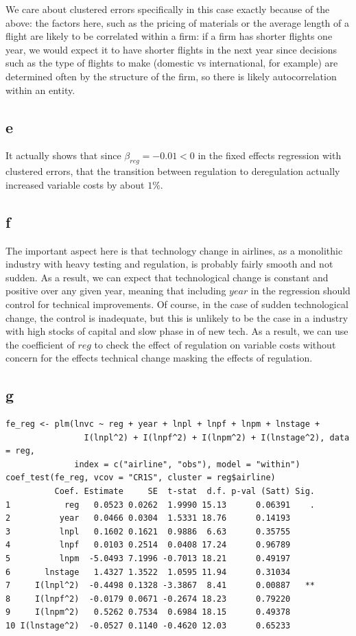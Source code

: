 \documentclass[12pt,letterpaper]{article}
\theoremstyle{definition}
\begin{document}
We care about clustered errors specifically in this case exactly because of the above: the factors here, such as the pricing of materials or the average length of a flight are likely to be correlated within a firm: if a firm has shorter flights one year, we would expect it to have shorter flights in the next year since decisions such as the type of flights to make (domestic vs international, for example) are determined often by the structure of the firm, so there is likely autocorrelation within an entity.

\subsection*{e}

It actually shows that since $\beta_{reg} = -0.01 < 0$ in the fixed effects regression with clustered errors, that the transition between regulation to deregulation actually increased variable costs by about $1\%$.

\subsection*{f}

The important aspect here is that technology change in airlines, as a monolithic industry with heavy testing and regulation, is probably fairly smooth and not sudden. As a result, we can expect that technological change is constant and positive over any given year, meaning that including $year$ in the regression should control for technical improvements. Of course, in the case of sudden technological change, the control is inadequate, but this is unlikely to be the case in a industry with high stocks of capital and slow phase in of new tech. As a result, we can use the coefficient of $reg$ to check the effect of regulation on variable costs without concern for the effects technical change masking the effects of regulation.

\subsection*{g}

\begin{Verbatim}[fontsize=\small]
fe_reg <- plm(lnvc ~ reg + year + lnpl + lnpf + lnpm + lnstage +
                I(lnpl^2) + I(lnpf^2) + I(lnpm^2) + I(lnstage^2), data = reg,
              index = c("airline", "obs"), model = "within")
coef_test(fe_reg, vcov = "CR1S", cluster = reg$airline)
          Coef. Estimate     SE  t-stat  d.f. p-val (Satt) Sig.
1           reg   0.0523 0.0262  1.9990 15.13      0.06391    .
2          year   0.0466 0.0304  1.5331 18.76      0.14193
3          lnpl   0.1602 0.1621  0.9886  6.63      0.35755
4          lnpf   0.0103 0.2514  0.0408 17.24      0.96789
5          lnpm  -5.0493 7.1996 -0.7013 18.21      0.49197
6       lnstage   1.4327 1.3522  1.0595 11.94      0.31034
7     I(lnpl^2)  -0.4498 0.1328 -3.3867  8.41      0.00887   **
8     I(lnpf^2)  -0.0179 0.0671 -0.2674 18.23      0.79220
9     I(lnpm^2)   0.5262 0.7534  0.6984 18.15      0.49378
10 I(lnstage^2)  -0.0527 0.1140 -0.4620 12.03      0.65233
\end{Verbatim}
\end{document}
